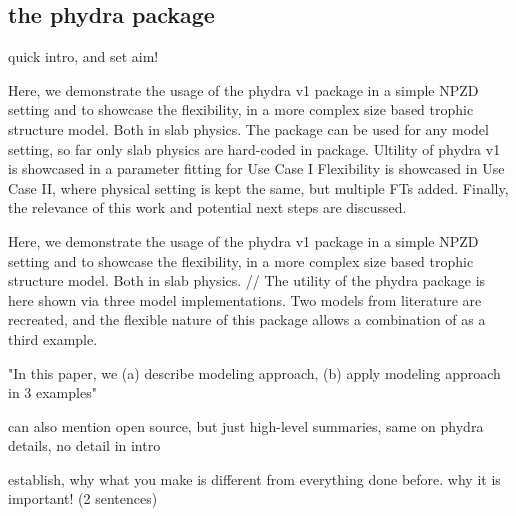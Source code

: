 \documentclass[journal abbreviation, manuscript]{copernicus}
\begin{document}
\subsection{the phydra package}


quick intro, and set aim!

Here, we demonstrate the usage of the phydra v1 package in a simple NPZD setting and to showcase the flexibility, in a more complex size based trophic structure model. Both in slab physics.
The package can be used for any model setting, so far only slab physics are hard-coded in package.
Ultility of phydra v1 is showcased in a parameter fitting for Use Case I
Flexibility is showcased in Use Case II, where physical setting is kept the same, but multiple FTs added.
Finally, the relevance of this work and potential next steps are discussed.

Here, we demonstrate the usage of the phydra v1 package in a simple NPZD setting and to showcase the flexibility, in a more complex size based trophic structure model. Both in slab physics.
//
The utility of the phydra package is here shown via three model implementations. Two models from literature are recreated, and the flexible nature of this package allows a combination of as a third example. 


"In this paper, we (a) describe modeling approach, (b) apply modeling approach in 3 examples"

can also mention open source, but just high-level summaries, same on phydra details, no detail in intro

establish, why what you make is different from everything done before. why it is important! (2 sentences)
\end{document}
